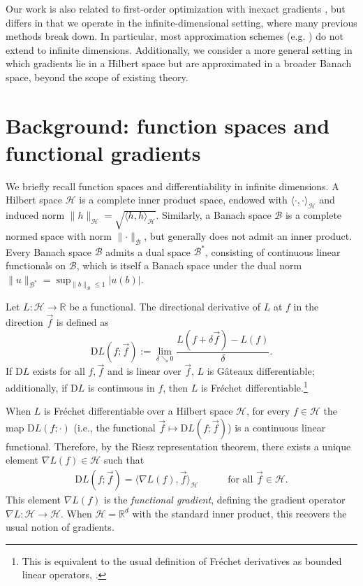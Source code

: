 \documentclass{article}
\newcommand{\R}{\mathbb{R}}
\renewcommand{\H}{\mathcal{H}}
\newcommand{\B}{\mathcal{B}}
\newcommand{\D}{\mathrm{D}}
\begin{document}
Our work is also related to first-order optimization with inexact gradients \citep{inexact-gd-1,inexact-gd-2,inexact-gd-3}, but differs in that we operate in the infinite-dimensional setting, where many previous methods break down.
In particular, most approximation schemes (e.g. \citep{finite-diff-gd-1,book-opt-hilbert,finite-diff-gd-3}) do not extend to infinite dimensions.
Additionally, we consider a more general setting in which gradients lie in a Hilbert space but are approximated in a broader Banach space, beyond the scope of existing theory.

\section{Background: function spaces and functional gradients}\label{sec:background}

We briefly recall function spaces and differentiability in infinite dimensions.
A Hilbert space $\H$ is a complete inner product space, endowed with $\langle \cdot, \cdot \rangle_\H$ and induced norm $\lVert h \rVert_\H = \sqrt{\langle h, h \rangle_\H}$.
Similarly, a Banach space $\B$ is a complete normed space with norm $\lVert \cdot \rVert_\B$, but generally does not admit an inner product.
Every Banach space $\B$ admits a dual space $\B^*$, consisting of continuous linear functionals on $\B$, which is itself a Banach space under the dual norm $\lVert u \rVert_{\B^*} = \sup_{\lVert b \rVert_\B \leq 1} \lvert u(b) \rvert$.

Let $L : \H \to \R$ be a functional.
The directional derivative of $L$ at $f$ in the direction $\vec{f}$ is defined as 
\[ \D L(f; \vec{f}) := \lim_{\delta \searrow 0} \frac{L(f + \delta \vec{f}) - L(f)}{\delta}. \]
If $\D L$ exists for all $f, \vec{f}$ and is linear over $\vec{f}$, $L$ is Gâteaux differentiable;
additionally, if $\D L$ is continuous in $f$, then $L$ is Fréchet differentiable.\footnote{This is equivalent to the usual definition of Fréchet derivatives as bounded linear operators, \citep{book-intro-to-nonlinear-analysis}.}

When $L$ is Fréchet differentiable over a Hilbert space $\H$, for every $f \in \H$ the map $\D L(f; \cdot)$ (i.e., the functional $\vec{f} \mapsto \D L(f; \vec{f})$) is a continuous linear functional. Therefore, by the Riesz representation theorem, there exists a unique element $\nabla L(f) \in \H$ such that
\begin{align}\label{e-functional-gradient}
    \D L(f; \vec{f}) = \langle \nabla L(f), \vec{f} \rangle_\H \qquad\quad \text{for all } \vec{f} \in \H.
\end{align}
This element $\nabla L(f)$ is the \emph{functional gradient}, defining the gradient operator $\nabla L : \H \to \H$.
When $\H = \R^d$ with the standard inner product, this recovers the usual notion of gradients.
\end{document}
